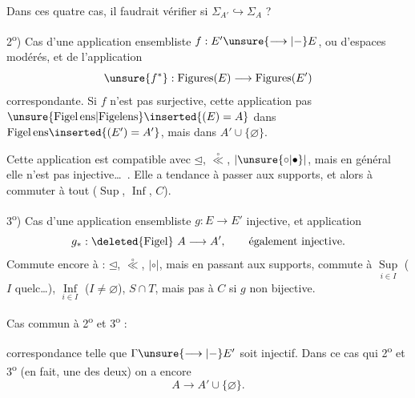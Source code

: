 \margin{$\Vert$}
Dans ces quatre cas, il faudrait vérifier si $\Sigma_{A'}\hookrightarrow\Sigma_A$ ?

2\textsuperscript{o}) Cas d'une application ensembliste  $f:E'\unsure{\longrightarrow|{-}}E$, ou d'espaces modérés\inserted{\ldots}, et de l'application
\[
\unsure{f^*}:\operatorname{Figures}(E)\longrightarrow\operatorname{Figures}(E')
\]
correspondante. Si $f$ n'est pas surjective, cette application  pas $\unsure{\mathrm{Figel}\,\mathrm{ens}|\mathrm{Figelens}}\inserted{(E)=A}$ dans $\mathrm{Figel}\,\mathrm{ens}\inserted{(E')=A'}$, mais dans  $A'\cup\{\varnothing\}$.

Cette application est compatible avec $\unlhd$, $\overset{\circ}{\ll}$, $|\unsure{\circ|\bullet}|$, mais en général elle n'est pas injective\ldots\ . Elle a tendance à passer aux supports, et alors à commuter à tout ($\operatorname{Sup}$, $\operatorname{Inf}$, $C$).

3\textsuperscript{o}) Cas d'une application ensembliste $g:E\longrightarrow E'$\unsure{,|*} injective, et application
\[
g_*:\deleted{\mathrm{Figel}}\ A\longrightarrow A',\qquad\text{également injective.}
\]
Commute encore à : $\unlhd$, $\overset{\circ}{\ll}$, $|\circ|$, mais en passant aux supports, commute à $\underset{i\in I}{\operatorname{Sup}}$ ($I$ quelc\ldots), $\underset{i\in I}{\operatorname{Inf}}$ ($I\ne\varnothing$), $S\cap T$, mais pas à $C$ si $g$ non bijective.

Cas commun à 2\textsuperscript{o} et 3\textsuperscript{o} :

correspondance
telle que $\Gamma\unsure{\longrightarrow|{-}}E'$ soit injectif\inserted{!!}. Dans ce cas qui  2\textsuperscript{o} et 3\textsuperscript{o} (en fait, une  des deux) on a encore
\[
A\longrightarrow A'\cup\{\varnothing\}.
\]

